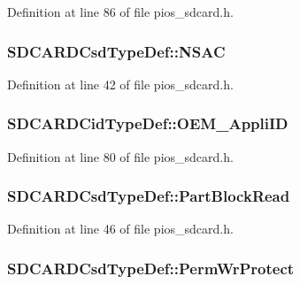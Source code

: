 Definition at line 86 of file pios\-\_\-sdcard.\-h.

\hypertarget{group___p_i_o_s___s_d_c_a_r_d_ga8573c74ea99da2cfb8f4848fa4350491}{
\subsubsection[{N\-S\-A\-C}]{ S\-D\-C\-A\-R\-D\-Csd\-Type\-Def\-::\-N\-S\-A\-C}}\label{group___p_i_o_s___s_d_c_a_r_d_ga8573c74ea99da2cfb8f4848fa4350491}


Definition at line 42 of file pios\-\_\-sdcard.\-h.

\hypertarget{group___p_i_o_s___s_d_c_a_r_d_gaba70fef7b702c2d5dc086c3cc997d4bc}{
\subsubsection[{O\-E\-M\-\_\-\-Appli\-I\-D}]{ S\-D\-C\-A\-R\-D\-Cid\-Type\-Def\-::\-O\-E\-M\-\_\-\-Appli\-I\-D}}\label{group___p_i_o_s___s_d_c_a_r_d_gaba70fef7b702c2d5dc086c3cc997d4bc}


Definition at line 80 of file pios\-\_\-sdcard.\-h.

\hypertarget{group___p_i_o_s___s_d_c_a_r_d_gab165bf6b064166e0bf54f2a6c7d85a9a}{
\subsubsection[{Part\-Block\-Read}]{ S\-D\-C\-A\-R\-D\-Csd\-Type\-Def\-::\-Part\-Block\-Read}}\label{group___p_i_o_s___s_d_c_a_r_d_gab165bf6b064166e0bf54f2a6c7d85a9a}


Definition at line 46 of file pios\-\_\-sdcard.\-h.

\hypertarget{group___p_i_o_s___s_d_c_a_r_d_ga191082389493442ce0b103f97282b952}{
\subsubsection[{Perm\-Wr\-Protect}]{ S\-D\-C\-A\-R\-D\-Csd\-Type\-Def\-::\-Perm\-Wr\-Protect}}\label{group___p_i_o_s___s_d_c_a_r_d_ga191082389493442ce0b103f97282b952}


